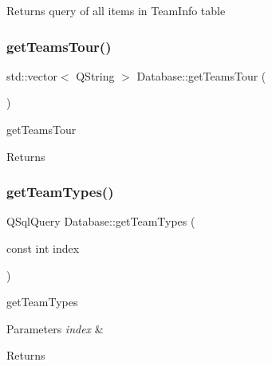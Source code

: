 \begin{DoxyReturn}{Returns}
query of all items in Team\+Info table 
\end{DoxyReturn}
\mbox{\label{class_database_a58d31282aed93e50be29a8a447fd100e}} 
\subsubsection{\texorpdfstring{get\+Teams\+Tour()}{getTeamsTour()}}
{\footnotesize\ttfamily std\+::vector$<$ Q\+String $>$ Database\+::get\+Teams\+Tour (\begin{DoxyParamCaption}{ }\end{DoxyParamCaption})}



get\+Teams\+Tour 

\begin{DoxyReturn}{Returns}

\end{DoxyReturn}
\mbox{\label{class_database_ae4b6ca4c6d269b46fcbf186ecdfc3f80}} 
\subsubsection{\texorpdfstring{get\+Team\+Types()}{getTeamTypes()}}
{\footnotesize\ttfamily Q\+Sql\+Query Database\+::get\+Team\+Types (\begin{DoxyParamCaption}\item[{const int}]{index }\end{DoxyParamCaption})}



get\+Team\+Types 


\begin{DoxyParams}{Parameters}
{\em index} & \\
\hline
\end{DoxyParams}
\begin{DoxyReturn}{Returns}

\end{DoxyReturn}
\mbox{\label{class_database_a25d0f42914d6c1741bae914b5c335a8a}} 
